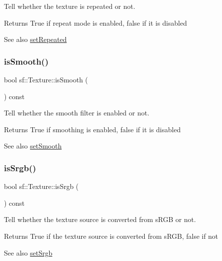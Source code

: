 Tell whether the texture is repeated or not. 

\begin{DoxyReturn}{Returns}
True if repeat mode is enabled, false if it is disabled
\end{DoxyReturn}
\begin{DoxySeeAlso}{See also}
\hyperlink{classsf_1_1_texture_aaa87d1eff053b9d4d34a24c784a28658}{set\+Repeated} 
\end{DoxySeeAlso}
\mbox{\label{classsf_1_1_texture_a3ebb050b5a71e1d40ba66eb1a060e103}} 
\subsubsection{\texorpdfstring{is\+Smooth()}{isSmooth()}}
{\footnotesize\ttfamily bool sf\+::\+Texture\+::is\+Smooth (\begin{DoxyParamCaption}{ }\end{DoxyParamCaption}) const}



Tell whether the smooth filter is enabled or not. 

\begin{DoxyReturn}{Returns}
True if smoothing is enabled, false if it is disabled
\end{DoxyReturn}
\begin{DoxySeeAlso}{See also}
\hyperlink{classsf_1_1_texture_a0c3bd6825b9a99714f10d44179d74324}{set\+Smooth} 
\end{DoxySeeAlso}
\mbox{\label{classsf_1_1_texture_a9d77ce4f8124abfda96900a6bd53bfe9}} 
\subsubsection{\texorpdfstring{is\+Srgb()}{isSrgb()}}
{\footnotesize\ttfamily bool sf\+::\+Texture\+::is\+Srgb (\begin{DoxyParamCaption}{ }\end{DoxyParamCaption}) const}



Tell whether the texture source is converted from s\+R\+GB or not. 

\begin{DoxyReturn}{Returns}
True if the texture source is converted from s\+R\+GB, false if not
\end{DoxyReturn}
\begin{DoxySeeAlso}{See also}
\hyperlink{classsf_1_1_texture_af8a38872c50a33ff074bd0865db19dd4}{set\+Srgb} 
\end{DoxySeeAlso}
\mbox{\label{classsf_1_1_texture_a8e1b56eabfe33e2e0e1cb03712c7fcc7}} 
